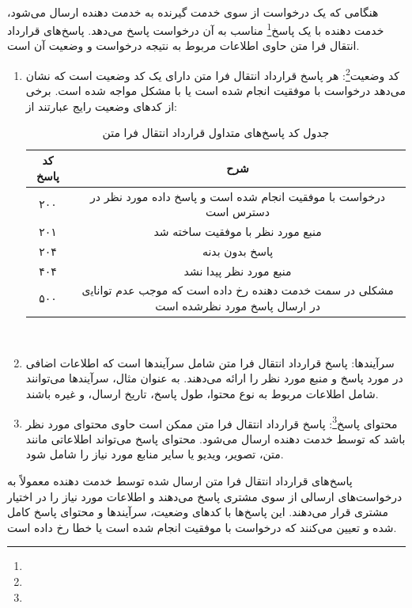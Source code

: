 \paragraph{}
{
    هنگامی که یک درخواست از سوی خدمت گیرنده به خدمت دهنده‌ ارسال می‌شود، خدمت دهنده‌ با یک پاسخ\footnote{} مناسب به آن درخواست پاسخ می‌دهد. پاسخ‌های قرارداد انتقال فرا متن حاوی اطلاعات مربوط به نتیجه درخواست و وضعیت آن است.
    \begin{enumerate}
        \item کد وضعیت\footnote{}: هر پاسخ قرارداد انتقال فرا متن دارای یک کد وضعیت است که نشان می‌دهد درخواست با موفقیت انجام شده است یا با مشکل مواجه شده است. برخی از کدهای وضعیت رایج عبارتند از:
            \begin{table}[]
                \begin{tabular}{|c|c|}
                \hline
                کد پاسخ & شرح                                                                                  \\ \hline
                ۲۰۰     & درخواست ﺑﺎ ﻣﻮﻓﻘﯿﺖ اﻧﺠﺎم ﺷﺪه اﺳﺖ و پاسخ داده ﻣﻮرد ﻧﻈﺮ در دﺳﺘﺮس اﺳﺖ                     \\ \hline
                ۲۰۱     & منبع مورد نظر با موفقیت ساخته شد                     \\ \hline
                ۲۰۴     & پاسخ بدون بدنه                     \\ \hline
                ۴۰۴     & ﻣﻨﺒﻊ ﻣﻮرد ﻧﻈﺮ پیدا ﻧﺸﺪ                                                               \\ \hline
                ۵۰۰     & مشکلی در ﺳﻤﺖ ﺧﺪﻣﺖ دﻫﻨﺪه رخ داده اﺳﺖ که ﻣﻮﺟﺐ ﻋﺪم ﺗﻮاﻧﺎﯾی در ارﺳﺎل پاسخ ﻣﻮرد ﻧﻈﺮﺷﺪه اﺳﺖ \\ \hline
                \end{tabular}
                \caption{جدول کد پاسخ‌های متداول قرارداد انتقال فرا متن}
                \label{table1}
            \end{table}
            \\
        \item سرآیندها: پاسخ قرارداد انتقال فرا متن شامل سرآیندها است که اطلاعات اضافی در مورد پاسخ و منبع مورد نظر را ارائه می‌دهند. به عنوان مثال، سرآیندها می‌توانند شامل اطلاعات مربوط به نوع محتوا، طول پاسخ، تاریخ ارسال، و غیره باشند.
        \item محتوای پاسخ\footnote{}: پاسخ قرارداد انتقال فرا متن ممکن است حاوی محتوای مورد نظر باشد که توسط خدمت دهنده‌ ارسال می‌شود. محتوای پاسخ می‌تواند اطلاعاتی مانند متن، تصویر، ویدیو یا سایر منابع مورد نیاز را شامل شود.
    \end{enumerate}
    پاسخ‌های قرارداد انتقال فرا متن ارسال شده توسط خدمت دهنده‌ معمولاً به درخواست‌های ارسالی از سوی مشتری پاسخ می‌دهند و اطلاعات مورد نیاز را در اختیار مشتری قرار می‌دهند. این پاسخ‌ها با کدهای وضعیت، سرآیندها و محتوای پاسخ کامل شده و تعیین می‌کنند که درخواست با موفقیت انجام شده است یا خطا رخ داده است.
}

